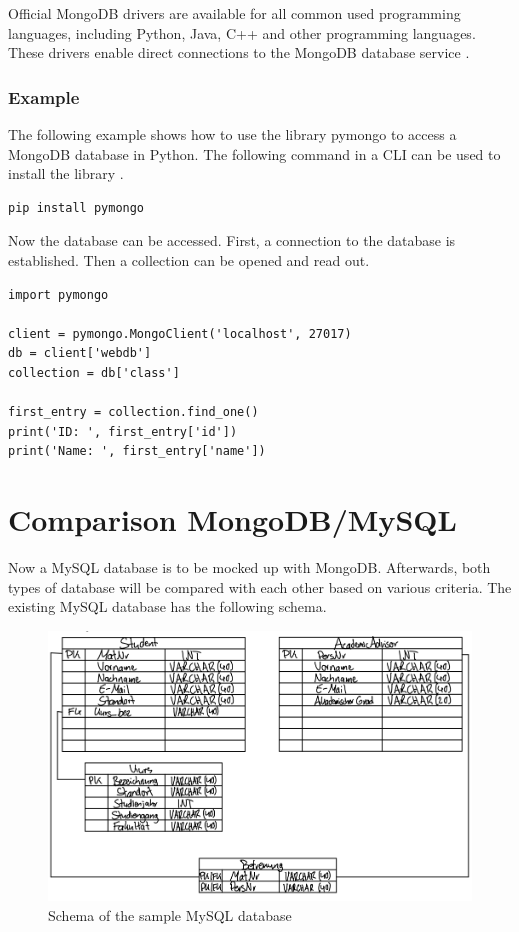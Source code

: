 Official MongoDB drivers are available for all common used programming languages, including Python, Java, C++ and other programming languages. These drivers enable direct connections to the MongoDB database service \parencite{mujdrica_drivers}.

\subsubsection{Example}

The following example shows how to use the library pymongo to access a MongoDB database in Python.  The following command in a CLI can be used to install the library \parencite{mujdrica_pymongo}.

\begin{verbatim}
pip install pymongo
\end{verbatim}

Now the database can be accessed. First, a connection to the database is established. Then a collection can be opened and read out.

\begin{verbatim}
import pymongo

client = pymongo.MongoClient('localhost', 27017)
db = client['webdb']
collection = db['class']

first_entry = collection.find_one()
print('ID: ', first_entry['id'])
print('Name: ', first_entry['name'])
\end{verbatim}

\section{Comparison MongoDB/MySQL}

Now a MySQL database is to be mocked up with MongoDB. Afterwards, both types of database will be compared with each other based on various criteria. The existing MySQL database has the following schema.

\begin{figure}[H]
    \centering
    \caption{Schema of the sample MySQL database} \label{fig:mysql_schema}
    \includegraphics[width=1.0\textwidth]{images/mujdrica/mysql_schema.png}
\end{figure}

